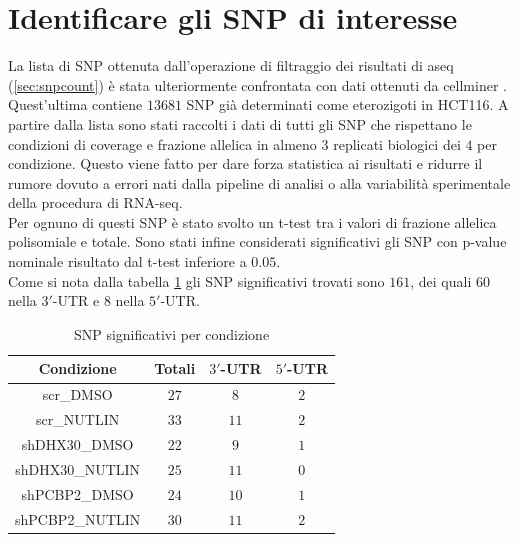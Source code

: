 \section{Identificare gli SNP di interesse}
\label{sec:snp_filter}
La lista di SNP ottenuta dall'operazione di filtraggio dei risultati di aseq (\ref{sec:snpcount}) \`e stata ulteriormente confrontata con dati ottenuti da cellminer \cite{cellminer}.
Quest'ultima contiene $13681$ SNP gi\`a determinati come eterozigoti in HCT116.
A partire dalla lista sono stati raccolti i dati di tutti gli SNP che rispettano le condizioni di coverage e frazione allelica in almeno $3$ replicati biologici dei $4$ per condizione.
Questo viene fatto per dare forza statistica ai risultati e ridurre il rumore dovuto a errori nati dalla pipeline di analisi o alla variabilit\`a sperimentale della procedura di RNA-seq.\\
Per ognuno di questi SNP \`e stato svolto un t-test \cite{ttest} tra i valori di frazione allelica polisomiale e totale.
Sono stati infine considerati significativi gli SNP con p-value nominale risultato dal t-test inferiore a $0.05$.\\
Come si nota dalla tabella \ref{tab:significativesnp} gli SNP significativi trovati sono $161$, dei quali $60$ nella $3'$-UTR e $8$ nella $5'$-UTR.
\begin{table}[H]
	\begin{tabular}{|c|c|c|c|}
		\hline
		Condizione & Totali & $3'$-UTR & $5'$-UTR\\
		\hline
		scr\_DMSO & $27$ & $8$ & $2$\\
		\hline
		scr\_NUTLIN & $33$ & $11$ & $2$\\
		\hline
		shDHX30\_DMSO & $22$ & $9$ & $1$\\
		\hline
		shDHX30\_NUTLIN & $25$ & $11$ & $0$\\
		\hline
		shPCBP2\_DMSO & $24$ & $10$ & $1$\\
		\hline
		shPCBP2\_NUTLIN & $30$ & $11$ & $2$\\
		\hline
	\end{tabular}
	\centering
	\caption{SNP significativi per condizione}
	\label{tab:significativesnp}
\end{table}

